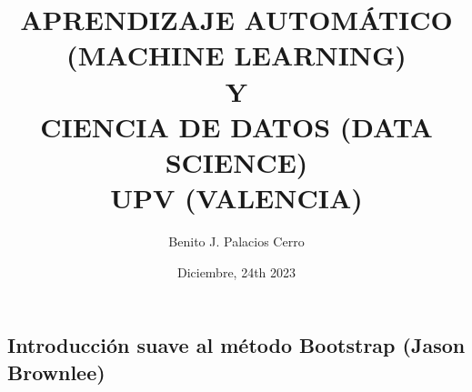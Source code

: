 \documentclass[11pt,a4paper]{report}
\author{Benito J. Palacios Cerro}
\title{APRENDIZAJE AUTOMÁTICO (MACHINE LEARNING) \\
Y \\
CIENCIA DE DATOS (DATA SCIENCE)\\
\vspace{3cm} UPV (VALENCIA)}
\date{Diciembre, 24th 2023}
\begin{document}
    
    
    \maketitle

    \tableofcontents

    
    
    


    \appendix 
    \begin{appendices}
        \chapter{Introducción suave al método Bootstrap (Jason Brownlee)}
        
    
    \end{appendices}
    
\end{document}
